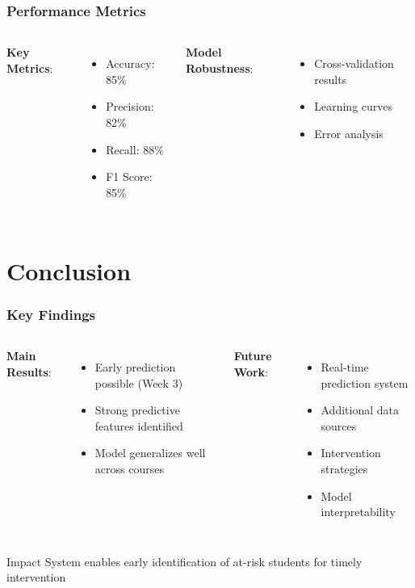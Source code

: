 \documentclass{beamer}
\begin{document}
\begin{frame}
\frametitle{Performance Metrics}
    \begin{columns}
        \textbf{Key Metrics}:
            \begin{itemize}
            \item Accuracy: 85\%
            \item Precision: 82\%
            \item Recall: 88\%
            \item F1 Score: 85\%
            \end{itemize}
            
        \textbf{Model Robustness}:
            \begin{itemize}
            \item Cross-validation results
            \item Learning curves
            \item Error analysis
            \end{itemize}
                
    \end{columns}
\end{frame}

\section{Conclusion}

\begin{frame}
\frametitle{Key Findings}
    \begin{columns}
        \textbf{Main Results}:
            \begin{itemize}
            \item Early prediction possible (Week 3)
            \item Strong predictive features identified
            \item Model generalizes well across courses
            \end{itemize}
            
        \textbf{Future Work}:
            \begin{itemize}
            \item Real-time prediction system
            \item Additional data sources
            \item Intervention strategies
            \item Model interpretability
            \end{itemize}
                
    \end{columns}

    \begin{alertblock}{Impact}
        System enables early identification of at-risk students for timely intervention
    \end{alertblock}
\end{frame}
\end{document}
